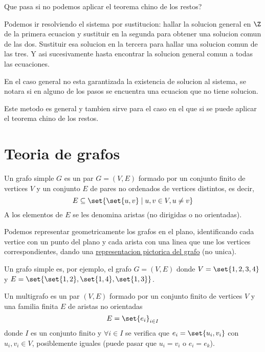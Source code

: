 \begin{remark}
	Que pasa si no podemos aplicar el teorema chino de los restos?

	Podemos ir resolviendo el sistema por sustitucion: hallar la solucion general en \(\Z \) de la primera ecuacion y sustituir en la segunda para obtener una solucion comun de las dos. Sustituir esa solucion en la tercera para hallar una solucion comun de las tres. Y asi sucesivamente hasta encontrar la solucion general comun a todas las ecuaciones.

	En el caso general no esta garantizada la existencia de solucion al sistema, se notara si en alguno de los pasos se encuentra una ecuacion que no tiene solucion.

	Este metodo es general y tambien sirve para el caso en el que si se puede aplicar el teorema chino de los restos.
\end{remark}

\part{Teoria de grafos}
\begin{definition}
	Un grafo simple \(G \) es un par \(G = (V,E )\) formado por un conjunto finito de vertices \(V \) y un conjunto \(E \) de pares no ordenados de vertices distintos, es decir,
	\[
		E \subseteq \set{\set{u,v} \mid u,v \in V, u \neq v }
	\]
	A los elementos de \(E \) se les denomina aristas (no dirigidas o no orientadas).
\end{definition}

Podemos representar geometricamente los grafos en el plano, identificando cada vertice con un punto del plano y cada arista con una linea que une los vertices correspondientes, dando una \underline{representacion pictorica del grafo} (no unica).

\begin{example}
	Un grafo simple es, por ejemplo, el grafo \(G=(V,E )\) donde \(V = \set{1,2,3,4}\) y \(E = \set{\set{1,2}, \set{1,4}, \set{1,3}}\).
\end{example}

\begin{definition}[Multigrafo]
	Un multigrafo es un par \((V,E )\) formado por un conjunto finito de vertices \(V \) y una familia finita \(E \) de aristas no orientadas
	\[
		E = \set{e_i}_{i \in I}
	\]
	donde \(I \) es un conjunto finito y \(\forall i \in I \) se verifica que \(e_i = \set{u_i,v_i }\) con \(u_i,v_i \in V\), posiblemente iguales (puede pasar que \(u_i = v_i \) o \(e_i = e_k \)).
\end{definition}


